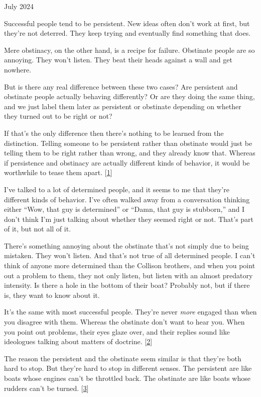 July 2024

Successful people tend to be persistent. New ideas often don't work at
first, but they're not deterred. They keep trying and eventually find
something that does.

Mere obstinacy, on the other hand, is a recipe for failure. Obstinate
people are so annoying. They won't listen. They beat their heads against
a wall and get nowhere.

But is there any real difference between these two cases? Are persistent
and obstinate people actually behaving differently? Or are they doing
the same thing, and we just label them later as persistent or obstinate
depending on whether they turned out to be right or not?

If that's the only difference then there's nothing to be learned from
the distinction. Telling someone to be persistent rather than obstinate
would just be telling them to be right rather than wrong, and they
already know that. Whereas if persistence and obstinacy are actually
different kinds of behavior, it would be worthwhile to tease them apart.
{[}\hyperref[f1n]{1}{]}

I've talked to a lot of determined people, and it seems to me that
they're different kinds of behavior. I've often walked away from a
conversation thinking either ``Wow, that guy is determined'' or ``Damn,
that guy is stubborn,'' and I don't think I'm just talking about whether
they seemed right or not. That's part of it, but not all of it.

There's something annoying about the obstinate that's not simply due to
being mistaken. They won't listen. And that's not true of all determined
people. I can't think of anyone more determined than the Collison
brothers, and when you point out a problem to them, they not only
listen, but listen with an almost predatory intensity. Is there a hole
in the bottom of their boat? Probably not, but if there is, they want to
know about it.

It's the same with most successful people. They're never \emph{more}
engaged than when you disagree with them. Whereas the obstinate don't
want to hear you. When you point out problems, their eyes glaze over,
and their replies sound like ideologues talking about matters of
doctrine. {[}\hyperref[f2n]{2}{]}

The reason the persistent and the obstinate seem similar is that they're
both hard to stop. But they're hard to stop in different senses. The
persistent are like boats whose engines can't be throttled back. The
obstinate are like boats whose rudders can't be turned.
{[}\hyperref[f3n]{3}{]}

